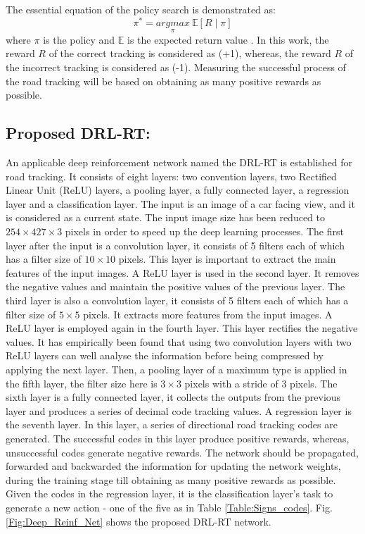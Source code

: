 The essential equation of the policy search is demonstrated as:
\begin{equation}
\pi^*=\underset{\pi}{argmax}~\mathbb{E} [R\mid\pi]
\label{Eq:MDP}
\end{equation}
where $\pi$ is the policy and $\mathbb{E}$ is the expected return value \cite{arulkumaran2017brief}. In this work, the reward $R$ of the correct tracking is considered as (+1), whereas, the reward $R$ of the incorrect tracking is considered as (-1). Measuring the successful process of the road tracking will be based on obtaining as many positive rewards as possible. 

\subsection{Proposed DRL-RT:} 
An applicable deep reinforcement network named the DRL-RT is established for road tracking. It consists of eight layers: two convention layers, two Rectified Linear Unit (ReLU) layers, a pooling layer, a fully connected layer, a regression layer and a classification layer. The input is an image of a car facing view, and it is considered as a current state. The input image size has been reduced to $254 \times 427 \times 3$ pixels in order to speed up the deep learning processes. The first layer after the input is a convolution layer, it consists of 5 filters each of which has a filter size of $10 \times 10$ pixels. This layer is important to extract the main features of the input images. A ReLU layer is used in the second layer. It removes the negative values and maintain the positive values of the previous layer. The third layer is also a convolution layer, it consists of 5 filters each of which has a filter size of $5 \times 5$ pixels. It extracts more features from the input images. A ReLU layer is employed again in the fourth layer. This layer rectifies the negative values. It has empirically been found that using two convolution layers with two ReLU layers can well analyse the information before being compressed by applying the next layer. Then, a pooling layer of a maximum type is applied in the fifth layer, the filter size here is $3 \times 3$ pixels with a stride of 3 pixels. The sixth layer is a fully connected layer, it collects the outputs from the previous layer and produces a series of decimal code tracking values. A regression layer is the seventh layer. In this layer, a series of directional road tracking codes are generated. The successful codes in this layer produce positive rewards, whereas, unsuccessful codes generate negative rewards. The network should be propagated, forwarded and backwarded the information for updating the network weights, during the training stage till obtaining as many positive rewards as possible. Given the codes in the regression layer, it is the classification layer's task to generate a new action - one of the five as in Table \ref{Table:Signs_codes}. Fig. \ref{Fig:Deep_Reinf_Net} shows the proposed DRL-RT network.

